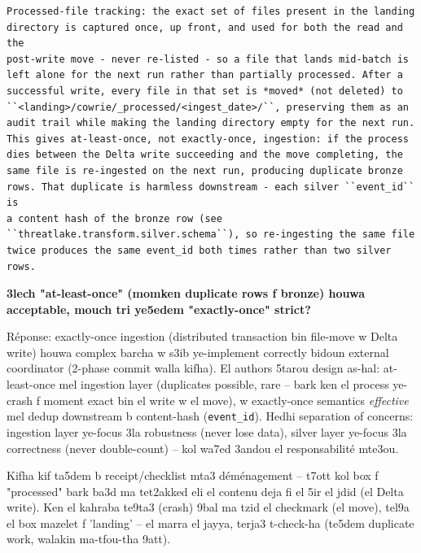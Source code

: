 \documentclass[11pt,a4paper]{report}
\DeclareRobustCommand{\code}[1]{\texttt{#1}}
\begin{document}
\begin{lstlisting}[style=pystyle]
Processed-file tracking: the exact set of files present in the landing
directory is captured once, up front, and used for both the read and the
post-write move - never re-listed - so a file that lands mid-batch is
left alone for the next run rather than partially processed. After a
successful write, every file in that set is *moved* (not deleted) to
``<landing>/cowrie/_processed/<ingest_date>/``, preserving them as an
audit trail while making the landing directory empty for the next run.
This gives at-least-once, not exactly-once, ingestion: if the process
dies between the Delta write succeeding and the move completing, the
same file is re-ingested on the next run, producing duplicate bronze
rows. That duplicate is harmless downstream - each silver ``event_id`` is
a content hash of the bronze row (see
``threatlake.transform.silver.schema``), so re-ingesting the same file
twice produces the same event_id both times rather than two silver rows.
\end{lstlisting}

\begin{soual}
\textbf{3lech "at-least-once" (momken duplicate rows f bronze) houwa
acceptable, mouch tri ye5edem "exactly-once" strict?}

Réponse: exactly-once ingestion (distributed transaction bin file-move
w Delta write) houwa complex barcha w s3ib ye-implement correctly bidoun
external coordinator (2-phase commit walla kifha). El authors 5tarou design
as-hal: at-least-once mel ingestion layer (duplicates possible, rare --
bark ken el process ye-crash f moment exact bin el write w el move), w
exactly-once semantics \emph{effective} mel dedup downstream b content-hash
(\code{event\_id}). Hedhi separation of concerns: ingestion layer ye-focus
3la robustness (never lose data), silver layer ye-focus 3la correctness
(never double-count) -- kol wa7ed 3andou el responsabilité mte3ou.
\end{soual}

\begin{analogy}
Kifha kif ta5dem b receipt/checklist mta3 déménagement -- t7ott kol box
f "processed" bark ba3d ma tet2akked eli el contenu deja fi el 5ir el jdid
(el Delta write). Ken el kahraba te9ta3 (crash) 9bal ma tzid el checkmark
(el move), tel9a el box mazelet f 'landing' -- el marra el jayya, terja3
t-check-ha (te5dem duplicate work, walakin ma-tfou-tha 9att).
\end{analogy}
\end{document}
